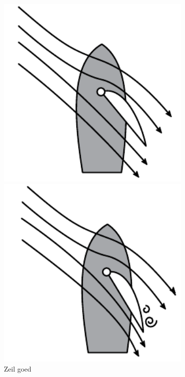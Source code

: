\begin{figure}[H]
  \centering
  \begin{minipage}[b]{0.32\textwidth}
  \centering
    \includegraphics[width=0.85\textwidth]{Hoofdstukken/Krachten/pdf/zeil_goed.pdf}
    \caption{Zeil goed}
    \label{pic:zeil_goed}
  \end{minipage}
  \hfill
  \begin{minipage}[b]{0.32\textwidth}
    \centering
    \includegraphics[width=0.85\textwidth]{../Hoofdstukken/Krachten/pdf/zeil_strak.pdf}

\end{minipage}
\end{figure}
